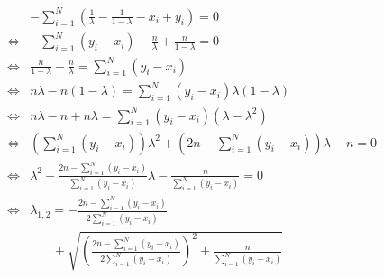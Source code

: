 \documentclass{article}
\begin{document}
\begin{align}
\begin{aligned}
& - \sum_{i=1}^{N} ( \frac{1}{\lambda} - \frac{1}{1- \lambda} - x_i + y_i) = 0 \\
\Leftrightarrow & - \sum_{i=1}^{N}( y_i - x_i)  - \frac{n}{\lambda} + \frac{n}{1-\lambda} = 0\\
\Leftrightarrow & \frac{n}{1-\lambda}  - \frac{n}{\lambda} = \sum_{i=1}^{N}( y_i - x_i)\\
\Leftrightarrow & n \lambda -n(1-\lambda) = \sum_{i=1}^{N}( y_i - x_i) \lambda (1 - \lambda)\\
\Leftrightarrow & n \lambda -n + n\lambda = \sum_{i=1}^{N}( y_i - x_i) (\lambda - \lambda^2)\\
\Leftrightarrow & (\sum_{i=1}^{N}( y_i - x_i)) \lambda^2 + (2n - \sum_{i=1}^{N}( y_i - x_i))\lambda - n = 0\\
\Leftrightarrow & \lambda^2 + \frac{2n - \sum_{i=1}^{N}( y_i - x_i)}{\sum_{i=1}^{N}( y_i - x_i)}\lambda - \frac{n}{\sum_{i=1}^{N}( y_i - x_i)} = 0\\
\Leftrightarrow & \lambda_{1,2} = - \frac{2n - \sum_{i=1}^{N}( y_i - x_i)}{2 \sum_{i=1}^{N}( y_i - x_i)}\\
		      & ~~~~~~~~\pm \sqrt{(\frac{2n - \sum_{i=1}^{N}( y_i - x_i)}{2 \sum_{i=1}^{N}( y_i - x_i)})^2 +\frac{n}{\sum_{i=1}^{N}( y_i - x_i)}} \\
\end{aligned}
\end{align}
\end{document}
